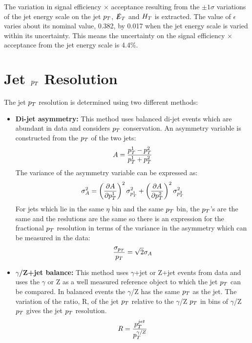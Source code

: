 The variation in signal efficiency $\times$ acceptance resulting from the
$\pm1\sigma$ variations of the jet energy scale on the jet $p_{T}$, $\slashed{E}_{T}$ and
$H_{T}$ is extracted. The value of $\epsilon$ varies about its nominal value,
0.382, by 0.017 when the jet energy scale is varied within its uncertainty.
This means the uncertainty on the signal efficiency $\times$ acceptance from the 
jet energy scale is 4.4\unit{\%}.

\section{Jet $p_{T}$ Resolution}

The jet $p_{T}$ resolution is determined using two different methods: 

\begin{itemize}
\item {\bf Di-jet asymmetry:} This method uses balanced di-jet events which are 
abundant in data and considers $p_{T}$ conservation. An asymmetry variable is 
constructed from the $p_{T}$ of the two jets:
\begin{equation}
A = \frac{p_{T}^{1} - p_{T}^{2}}{p_{T}^{1} + p_{T}^{2}}
\end{equation}
The variance of the asymmetry variable can be expressed as:
\begin{equation}
\sigma_{A}^{2} = \left(\frac{\partial A}{\partial
p_{T}^{1}}\right)^{2}\sigma_{p_{T}^{1}}^{2} + \left(\frac{\partial A}{\partial
p_{T}^{2}}\right)^{2}\sigma_{p_{T}^{2}}^{2}
\end{equation}
For jets which lie in the same $\eta$ bin and the same $p_{T}$ bin, the $p_{T}$'s
are the same and the reslutions are the same so there is an expression for the
fractional $p_{T}$ resolution in terms of the variance in the asymmetry which can
be measured in the data:
\begin{equation}
\frac{\sigma_{p_{T}}}{p_{T}} = \sqrt{2}\sigma_{A}
\end{equation}  
\item {\bf $\gamma$/Z+jet balance:} This method uses $\gamma$+jet or Z+jet
events from data and uses the $\gamma$ or Z as a well measured reference object
to which the jet $p_{T}$ can be compared. In balanced events the $\gamma$/Z has 
the same $p_{T}$ as the jet. The variation of the ratio, R, of the jet $p_{T}$ 
relative to the $\gamma$/Z $p_{T}$ in bins of $\gamma$/Z $p_{T}$ gives the jet $p_{T}$ 
resolution. 
\begin{equation}
R = \frac{p_{T}^{jet}}{p_{T}^{\gamma/Z}}
\end{equation}
\end{itemize}

